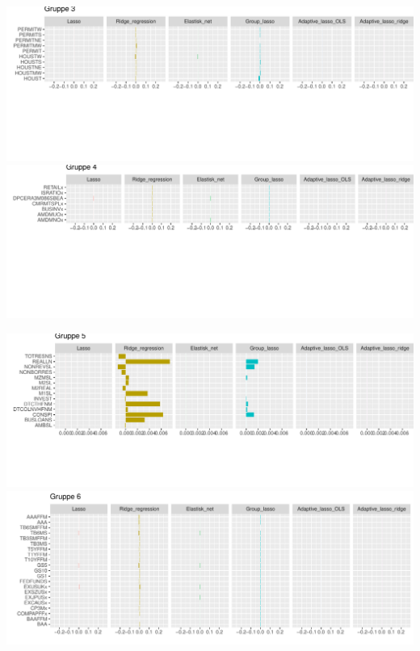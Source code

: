 \begin{landscape}
         \includegraphics[scale=0.75, clip, trim=0 4cm 0 0]{fig/img/coef_gr3.pdf} \\
         \includegraphics[scale=0.75, trim=0 5.5cm 0 0]{fig/img/coef_gr4.pdf} 
\end{landscape}
\begin{landscape}
         \includegraphics[scale=0.75, clip, trim=0 3cm 0 0]{fig/img/coef_gr5.pdf} \\
         \includegraphics[scale=0.75]{fig/img/coef_gr6.pdf}
\end{landscape}
